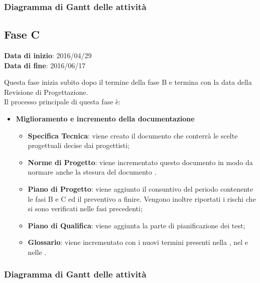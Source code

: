 		
		\subsubsection{Diagramma di Gantt delle attività}
		
	\subsection{Fase C}
	\begin{center}
		\textbf{Data di inizio}: 2016/04/29 \\
		\textbf{Data di fine}: 2016/06/17 \\
	\end{center}
	Questa fase inizia subito dopo il termine della fase B e termina con la data della Revisione di Progettazione. \\
	Il processo principale di questa fase è:
		\begin{itemize}
			\item \textbf{Miglioramento e incremento della documentazione}
			\att
			\begin{itemize}
				\item \textbf{Specifica Tecnica}: viene creato il documento \STdocRP che conterrà le scelte progettuali decise dai progettisti;
				\item \textbf{Norme di Progetto}: viene incrementato questo documento in modo da normare anche la stesura del documento \STdocRP.
				\item \textbf{Piano di Progetto}: viene aggiunto il consuntivo del periodo contenente le fasi B e C ed il preventivo a finire. Vengono inoltre riportati i rischi che si sono verificati nelle fasi precedenti;
				\item \textbf{Piano di Qualifica}: viene aggiunta la parte di pianificazione dei test;
				\item \textbf{Glossario}: viene incrementato con i nuovi termini presenti nella \STdocRP, nel \PQdocRP e nelle \NPdocRP.
			\end{itemize}
		\end{itemize}
		\subsubsection{Diagramma di Gantt delle attività}
		
		
		
